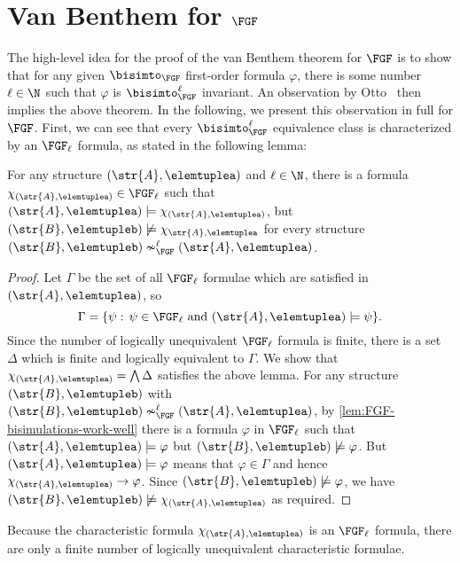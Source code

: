 \section{Van Benthem for $\FGF$}\label{sec:van-benthem-theorem}
The high-level idea for the proof of the van Benthem theorem for $\FGF$ is to show that for any given $\bisimto_{\FGF}$ first-order formula $\varphi$, there is some number $\ell \in \N$ such that $\varphi$ is $\bisimto_{\FGF}^{\ell}$ invariant.
An observation by Otto~\cite[Obs.~13]{Otto04} then implies the above theorem.
In the following, we present this observation in full for $\FGF$.
First, we can see that every $\bisimto_{\FGF}^{\ell}$ equivalence class is characterized by an $\FGF_{\ell}$ formula, as stated in the following lemma:
\begin{lemma}
  For any structure $(\str{A}, \elemtuplea)$ and $\ell \in \N$, there is a formula $\chi_{(\str{A}, \elemtuplea)} \in \FGF_{\ell}$ such that $(\str{A}, \elemtuplea) \models \chi_{(\str{A}, \elemtuplea)}$, but $(\str{B}, \elemtupleb) \not\models \chi_{\str{A}, \elemtuplea}$ for every structure $(\str{B}, \elemtupleb) \nsim^{\ell}_{\FGF} (\str{A}, \elemtuplea)$.
\end{lemma}
\begin{proof}
  Let $\Gamma$  be the set of all $\FGF_{\ell}$ formulae which are satisfied in $(\str{A}, \elemtuplea)$, so
  \begin{equation*}
    \Gamma = \{ \psi:\, \psi \in \FGF_{\ell} \text{ and } (\str{A}, \elemtuplea) \models \psi \}.
  \end{equation*}
  Since the number of logically unequivalent $\FGF_{\ell}$ formula is finite, there is a set $\Delta$ which is finite and logically equivalent to $\Gamma$.
  We show that $\chi_{(\str{A}, \elemtuplea)} = \bigwedge \Delta$ satisfies the above lemma.
  For any structure $(\str{B}, \elemtupleb)$ with $(\str{B}, \elemtupleb) \nsim_{\FGF}^{\ell} (\str{A}, \elemtuplea)$, by \cref{lem:FGF-bisimulations-work-well} there is a formula $\varphi$ in $\FGF_{\ell}$ such that $(\str{A}, \elemtuplea) \models \varphi$ but $(\str{B}, \elemtupleb) \not\models \varphi$.
  But $(\str{A}, \elemtuplea) \models \varphi$ means that $\varphi \in \Gamma$ and hence $\chi_{(\str{A},\elemtuplea)} \to \varphi$.
  Since $(\str{B}, \elemtupleb) \not\models \varphi$, we have $(\str{B}, \elemtupleb) \not\models \chi_{(\str{A}, \elemtuplea)}$ as required.
\end{proof}
Because the characteristic formula $\chi_{(\str{A}, \elemtuplea)}$ is an $\FGF_{\ell}$ formula, there are only a finite number of logically unequivalent characteristic formulae.
